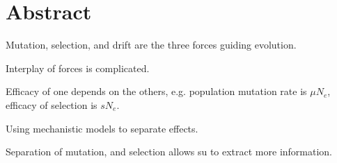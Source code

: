 \chapter*{Abstract}\label{ch:abstract}
Mutation, selection, and drift are the three forces guiding evolution.

Interplay of forces is complicated.

Efficacy of one depends on the others, e.g. population mutation rate is $\mu N_e$, efficacy of selection is $sN_e$.

Using mechanistic models to separate effects.

Separation of mutation, and selection allows su to extract more information.